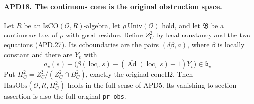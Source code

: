 \documentclass[11pt,a4paper]{article}
\numberwithin{equation}{section}
\theoremstyle{remark}\newtheorem{remark}[theorem]{Remark}
\begin{document}
\paragraph{APD18. The continuous cone is the original obstruction space.}
\label{claim:APD18}
Let \(R\) be an \(\mathrm{IsCO}(\mathcal O,R)\)-algebra,
let \(\rho.\mathrm{Univ}(\mathcal O)\) hold, and let
\(\mathfrak B\) be a continuous box of \(\rho\) with good
residue.  Define \(Z_C^2\) by local constancy and the two
equations (APD.27).  Its coboundaries are the pairs
\((d\beta,a)\), where \(\beta\) is locally constant and
there are \(Y_v\) with
\[
 a_v(s)-\bigl(\beta(\operatorname{loc}_v s)
       -(\overline{\operatorname{Ad}}(\operatorname{loc}_v s)-1)Y_v\bigr)
                                                    \in\mathfrak b_v.
                                                               \tag{APD.37}
\]
Put \(H_C^2=Z_C^2/(Z_C^2\cap B_C^2)\), exactly the original
\(\mathrm{coneH2}\).  Then
\(\mathrm{HasObs}(\mathcal O,R,H_C^2)\) holds in the full
sense of APD5.  Its vanishing-to-section assertion is also the
full original \texttt{pr\_\allowbreak obs}.
\end{document}
